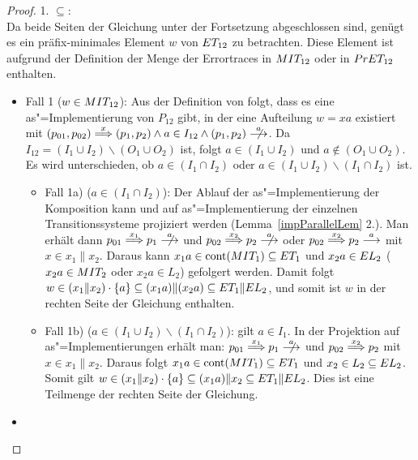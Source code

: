 \begin{proof}
  1. \glqq$\subseteq$\grqq{}:\\
  Da beide Seiten der Gleichung unter der Fortsetzung \cont{} abgeschlossen
  sind, genügt es ein präfix-minimales Element $w$ von $ET _{12}$ zu
  betrachten. Diese Element ist aufgrund der Definition der Menge der
  Errortraces in $MIT _{12}$ oder in $PrET _{12}$ enthalten.
  \begin{itemize}
    \item Fall 1 ($w\in MIT _{12}$): Aus der Definition von \MIT{} folgt, dass
      es eine as"=Implementierung von $P_{12}$ gibt, in der eine Aufteilung
      $w=xa$ existiert mit $(p_{01},p_{02}) \weakmust[x] (p_1,p_2) \land a
      \in I_{12} \land (p_1,p_2) \nmust[a]$. Da $I_{12} = (I_1\cup I_2)
      \backslash (O_1\cup O_2)$ ist, folgt $a\in (I_1\cup I_2)$ und $a\notin
      (O_1\cup O_2)$. Es wird unterschieden, ob $a\in (I_1\cap I_2)$ oder $a\in
      (I_1\cup I_2) \backslash (I_1\cap I_2)$ ist.
    \begin{itemize}
      \item Fall 1a) ($a\in (I_1\cap I_2)$): Der Ablauf der as"=Implementierung
        der Komposition kann und auf as"=Implementierung der einzelnen
        Transitionssysteme projiziert werden (Lemma~\ref{impParallelLem} 2.).
        Man erhält dann \oBdA{} $p_{01}\weakmust[x_1] p_1\nmust[a]$ und
        $p_{02}\weakmust[x_2] p_2\nmust[a]$ oder $p_{02}\weakmust[x_2]
        p_2\must[a]$ mit $x\in x_1\|x_2$. Daraus kann $x_1a\in \mathrm{cont} (MIT _1)
        \subseteq ET _1$ und $x_2a\in EL _2$ ($x_2a\in MIT _2$ oder $x_2a
        \in L_2$) gefolgert werden. Damit folgt $w\in (x_1\|x_2) \cdot \{a\}
        \subseteq (x_1a)\|(x_2a)\subseteq ET _1\|EL _2$, und somit ist $w$ in
        der rechten Seite der Gleichung enthalten.
      \item Fall 1b) ($a\in (I_1\cup I_2)\backslash (I_1\cap I_2)$): \OBdA{}
        gilt $a\in I_1$. In der Projektion auf as"=Implementierungen erhält
        man: $p_{01}\weakmust[x_1] p_1\nmust[a]$ und $p_{02}\weakmust[x_2]
        p_2$ mit $x\in x_1\|x_2$. Daraus folgt $x_1a\in \mathrm{cont} (MIT
        _1)\subseteq ET _1$ und $x_2\in L_2\subseteq EL _2$. Somit gilt $w\in
        (x_1\|x_2) \cdot \{a\} \subseteq (x_1a)\|x_2\subseteq ET _1\|EL _2$.
        Dies ist eine Teilmenge der rechten Seite der Gleichung.
    \end{itemize}
  \item {}


\end{itemize}
\end{proof}
